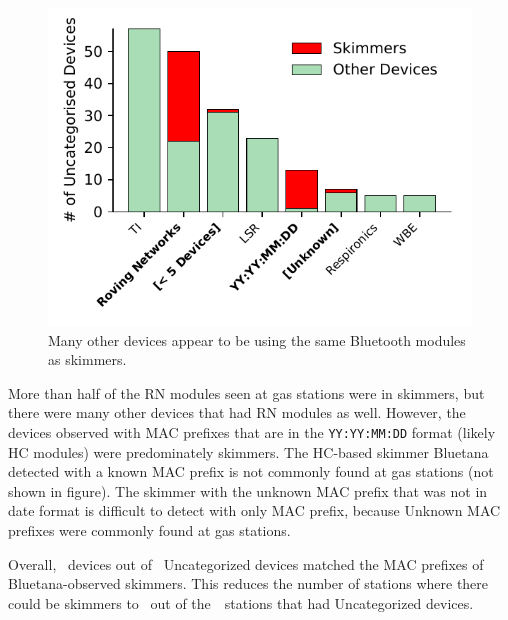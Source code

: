 \begin{figure}
\centering
\includegraphics[width=\linewidth]{plots/uncat_hist_device_OUI.pdf}
\caption{
\label{fig:hist_device_OUI}
Many other devices appear to be using the same Bluetooth modules as skimmers.
}
\end{figure}

More than half of the RN modules seen at gas stations were in skimmers, but
there were many other devices that had RN modules as well.
%
However, the devices observed with MAC prefixes that are in the
\texttt{YY:YY:MM:DD} format (likely HC modules) were predominately skimmers.
%
The HC-based skimmer Bluetana detected with a known MAC prefix is not commonly
found at gas stations (not shown in figure).
%
The skimmer with the unknown MAC prefix that was not in date format is
difficult to detect with only MAC prefix, because Unknown MAC prefixes
were commonly found at gas stations.

Overall, \numberBTMACCoDfiltered~devices out of
\numberbtuncategorized~Uncategorized devices matched the MAC prefixes of
Bluetana-observed skimmers.
%
This reduces the number of stations where there could be skimmers to
\visitedstationsMACCoDfiltered~out of the~\totaluncatstation~stations that had Uncategorized devices.

%
%
%
%
%

